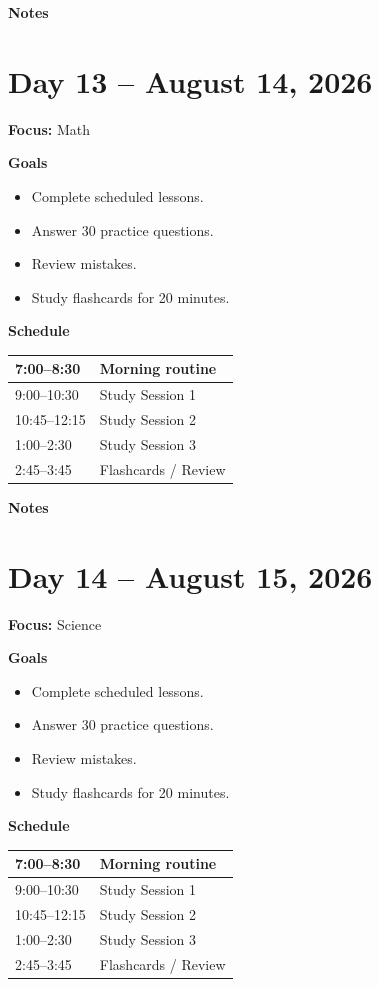 \vspace{1em}
\textbf{Notes}

\vspace{8cm}

\newpage

\section*{Day 13 -- August 14, 2026}
\textbf{Focus:} Math

\textbf{Goals}
\begin{itemize}
\item Complete scheduled lessons.
\item Answer 30 practice questions.
\item Review mistakes.
\item Study flashcards for 20 minutes.
\end{itemize}

\textbf{Schedule}
\begin{tabular}{|p{4cm}|p{10cm}|}\hline
7:00--8:30 & Morning routine \\\hline
9:00--10:30 & Study Session 1 \\\hline
10:45--12:15 & Study Session 2 \\\hline
1:00--2:30 & Study Session 3 \\\hline
2:45--3:45 & Flashcards / Review \\\hline
\end{tabular}

\vspace{1em}
\textbf{Notes}

\vspace{8cm}

\newpage

\section*{Day 14 -- August 15, 2026}
\textbf{Focus:} Science

\textbf{Goals}
\begin{itemize}
\item Complete scheduled lessons.
\item Answer 30 practice questions.
\item Review mistakes.
\item Study flashcards for 20 minutes.
\end{itemize}

\textbf{Schedule}
\begin{tabular}{|p{4cm}|p{10cm}|}\hline
7:00--8:30 & Morning routine \\\hline
9:00--10:30 & Study Session 1 \\\hline
10:45--12:15 & Study Session 2 \\\hline
1:00--2:30 & Study Session 3 \\\hline
2:45--3:45 & Flashcards / Review \\\hline
\end{tabular}

